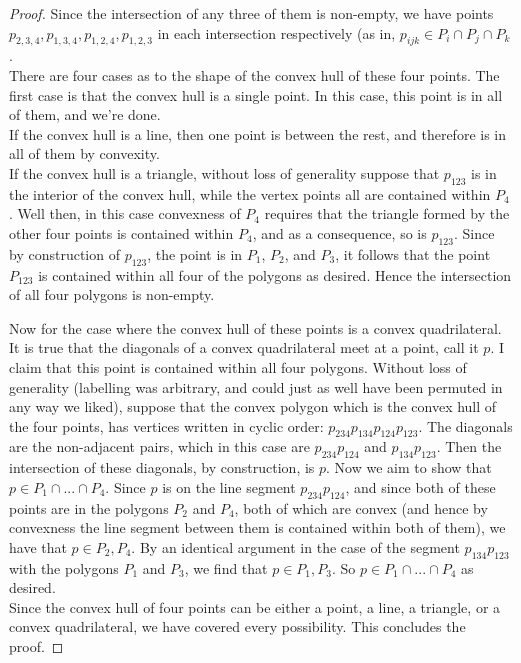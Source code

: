 \documentclass[12pt]{article}
\theoremstyle{definition}
\begin{document}
\begin{proof}

Since the intersection of any three of them is non-empty, we have points $p_{2,3,4}, p_{1,3,4}, p_{1,2,4}, p_{1,2,3} $ in each intersection respectively (as in, $p_{ijk}\in P_{i}\cap P_{j} \cap P_{k}$ .\\

There are four cases as to the shape of the convex hull of these four points. The first case is that the convex hull is a single point. In this case, this point is in all of them, and we're done.\\

If the convex hull is a line, then one point is between the rest, and therefore is in all of them by convexity. \\

If the convex hull is a triangle, without loss of generality suppose that $p_{123}$ is in the interior of the convex hull, while the vertex points all are contained within $P_4$. Well then, in this case convexness of $P_4$ requires that the triangle formed by the other four points is contained within $P_4$, and as a consequence, so is $p_{123}$. Since by construction of $p_{123}$, the point is in $P_1$, $P_2$, and $P_3$, it follows that the point $P_{123}$ is contained within all four of the polygons as desired. Hence the intersection of all four polygons is non-empty.

Now for the case where the convex hull of these points is a convex quadrilateral. It is true that the diagonals of a convex quadrilateral meet at a point, call it $p$. I claim that this point is contained within all four polygons. Without loss of generality (labelling was arbitrary, and could just as well have been permuted in any way we liked), suppose that the convex polygon which is the convex hull of the four points, has vertices written in cyclic order: $ p_{234}p_{134}p_{124}p_{123}. $ The diagonals are the non-adjacent pairs, which in this case are $ p_{234}p_{124} $ and $ p_{134}p_{123}$. Then the intersection of these diagonals, by construction, is $p$. Now we aim to show that $p\in P_1\cap ...\cap P_4$. Since $p$ is on the line segment $p_{234}p_{124}$, and since both of these points are in the polygons $P_2$ and $P_4$, both of which are convex (and hence by convexness the line segment between them is contained within both of them), we have that $p\in P_2,P_4$. By an identical argument in the case of the segment $p_{134}p_{123}$ with the polygons $P_1$ and $P_3$, we find that $p\in P_1, P_3$. So $p\in P_1\cap ... \cap P_4$ as desired.\\

Since the convex hull of four points can be either a point, a line, a triangle, or a convex quadrilateral, we have covered every possibility. This concludes the proof.
\end{proof}
\end{document}
